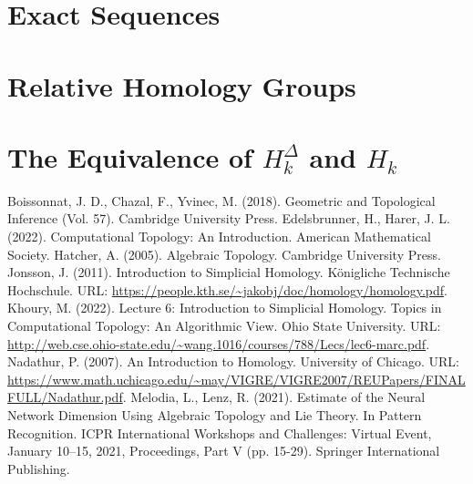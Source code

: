 \documentclass{article}
\begin{document}
\section{Exact Sequences}
\section{Relative Homology Groups}
\section{The Equivalence of $H_k^\Delta$ and $H_k$}

\begin{thebibliography}{100}
 Boissonnat, J. D., Chazal, F., Yvinec, M. (2018). Geometric and Topological Inference (Vol. 57). Cambridge University Press.
 Edelsbrunner, H., Harer, J. L. (2022). Computational Topology: An Introduction. American Mathematical Society.
 Hatcher, A. (2005). Algebraic Topology. Cambridge University Press.
 Jonsson, J. (2011). Introduction to Simplicial Homology. Königliche Technische Hochschule. URL: \url{https://people.kth.se/~jakobj/doc/homology/homology.pdf}.
 Khoury, M. (2022). Lecture 6: Introduction to Simplicial Homology. Topics in Computational Topology: An Algorithmic View. Ohio State University. URL: \url{http://web.cse.ohio-state.edu/~wang.1016/courses/788/Lecs/lec6-marc.pdf}.
 Nadathur, P. (2007). An Introduction to Homology. University of Chicago. URL: \url{https://www.math.uchicago.edu/~may/VIGRE/VIGRE2007/REUPapers/FINALFULL/Nadathur.pdf}.
 Melodia, L., Lenz, R. (2021). Estimate of the Neural Network Dimension Using Algebraic Topology and Lie Theory. In Pattern Recognition. ICPR International Workshops and Challenges: Virtual Event, January 10–15, 2021, Proceedings, Part V (pp. 15-29). Springer International Publishing.
\end{thebibliography}
\end{document}
